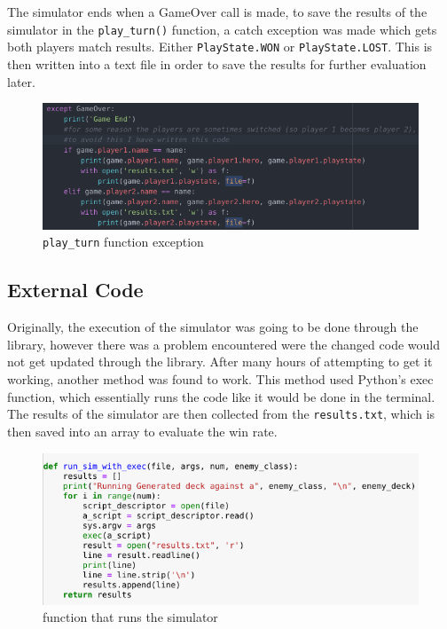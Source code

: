 \documentclass{report} %
\begin{document}
The simulator ends when a GameOver call is made, to save the results of the simulator in the \nolinkurl{play_turn()} function, a catch exception was made which gets both players match results. Either \nolinkurl{PlayState.WON} or \nolinkurl{PlayState.LOST}. This is then written into a text file in order to save the results for further evaluation later. 

\begin{figure}[H]
\centering
\includegraphics[width=1\textwidth]{playTurn}
\caption{\nolinkurl{play_turn} function exception\protect}
 \label{board}
\end{figure}

\subsection{External Code}
Originally, the execution of the simulator was going to be done through the library, however there was a problem encountered were the changed code would not get updated through the library. After many hours of attempting to get it working, another method was found to work. This method used Python's exec function, which essentially runs the code like it would be done in the terminal. The results of the simulator are then collected from the \nolinkurl{results.txt}, which is then saved into an array to evaluate the win rate.

\begin{figure}[H]
\centering
\includegraphics[width=1\textwidth]{simExec}
\caption{function that runs the simulator\protect}
 \label{board}
\end{figure}
\end{document}
